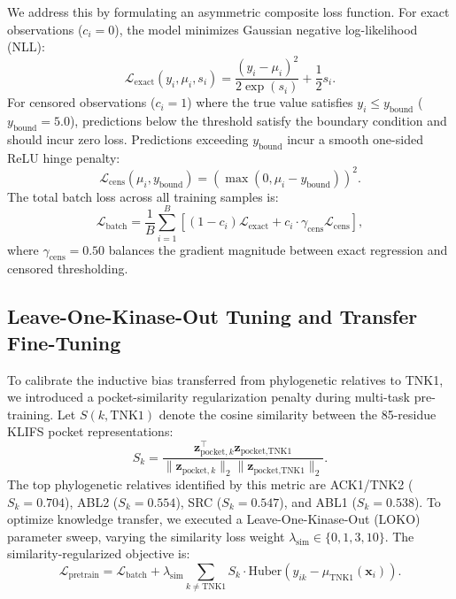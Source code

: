 \documentclass[journal]{IEEEtran}
\begin{document}
We address this by formulating an asymmetric composite loss function. For exact observations ($c_i = 0$), the model minimizes Gaussian negative log-likelihood (NLL):
\begin{equation}
    \mathcal{L}_{\text{exact}}(y_i, \mu_i, s_i) = \frac{(y_i - \mu_i)^2}{2\exp(s_i)} + \frac{1}{2}s_i.
\end{equation}
For censored observations ($c_i = 1$) where the true value satisfies $y_i \le y_{\text{bound}}$ ($y_{\text{bound}} = 5.0$), predictions below the threshold satisfy the boundary condition and should incur zero loss. Predictions exceeding $y_{\text{bound}}$ incur a smooth one-sided ReLU hinge penalty:
\begin{equation}
    \mathcal{L}_{\text{cens}}(\mu_i, y_{\text{bound}}) = \left( \max\left(0, \mu_i - y_{\text{bound}}\right) \right)^2.
\end{equation}
The total batch loss across all training samples is:
\begin{equation}
    \mathcal{L}_{\text{batch}} = \frac{1}{B}\sum_{i=1}^B \left[ (1 - c_i)\mathcal{L}_{\text{exact}} + c_i \cdot \gamma_{\text{cens}} \mathcal{L}_{\text{cens}} \right],
\end{equation}
where $\gamma_{\text{cens}} = 0.50$ balances the gradient magnitude between exact regression and censored thresholding.

\subsection{Leave-One-Kinase-Out Tuning and Transfer Fine-Tuning}
To calibrate the inductive bias transferred from phylogenetic relatives to TNK1, we introduced a pocket-similarity regularization penalty during multi-task pre-training. Let $S(k, \text{TNK1})$ denote the cosine similarity between the 85-residue KLIFS pocket representations:
\begin{equation}
    S_k = \frac{\mathbf{z}_{\text{pocket}, k}^\top \mathbf{z}_{\text{pocket}, \text{TNK1}}}{\|\mathbf{z}_{\text{pocket}, k}\|_2 \|\mathbf{z}_{\text{pocket}, \text{TNK1}}\|_2}.
\end{equation}
The top phylogenetic relatives identified by this metric are ACK1/TNK2 ($S_k = 0.704$), ABL2 ($S_k = 0.554$), SRC ($S_k = 0.547$), and ABL1 ($S_k = 0.538$). To optimize knowledge transfer, we executed a Leave-One-Kinase-Out (LOKO) parameter sweep, varying the similarity loss weight $\lambda_{\text{sim}} \in \{0, 1, 3, 10\}$. The similarity-regularized objective is:
\begin{equation}
    \mathcal{L}_{\text{pretrain}} = \mathcal{L}_{\text{batch}} + \lambda_{\text{sim}} \sum_{k \ne \text{TNK1}} S_k \cdot \text{Huber}\left(y_{ik} - \mu_{\text{TNK1}}(\mathbf{x}_i)\right).
\end{equation}
\end{document}
